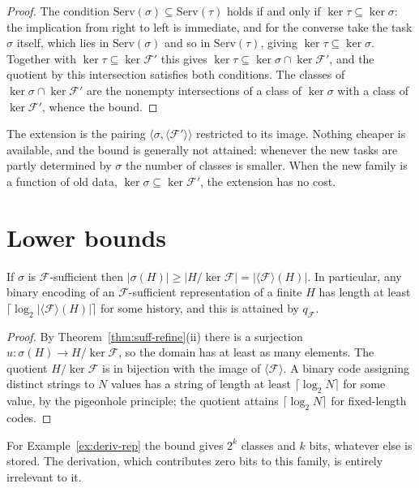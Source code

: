 \begin{proof}
The condition $\mathrm{Serv}(\sigma)\subseteq\mathrm{Serv}(\tau)$ holds if and only if $\ker\tau\subseteq\ker\sigma$: the implication from right to left is immediate, and for the converse take the task $\sigma$ itself, which lies in $\mathrm{Serv}(\sigma)$ and so in $\mathrm{Serv}(\tau)$, giving $\ker\tau\subseteq\ker\sigma$. Together with $\ker\tau\subseteq\ker\mathcal F'$ this gives $\ker\tau\subseteq\ker\sigma\cap\ker\mathcal F'$, and the quotient by this intersection satisfies both conditions. The classes of $\ker\sigma\cap\ker\mathcal F'$ are the nonempty intersections of a class of $\ker\sigma$ with a class of $\ker\mathcal F'$, whence the bound.
\end{proof}

The extension is the pairing $\langle\sigma,\langle\mathcal F'\rangle\rangle$ restricted to its image. Nothing cheaper is available, and the bound is generally not attained: whenever the new tasks are partly determined by $\sigma$ the number of classes is smaller. When the new family is a function of old data, $\ker\sigma\subseteq\ker\mathcal F'$, the extension has no cost.

\section{Lower bounds}

\begin{theorem}
\label{thm:lower}
If $\sigma$ is $\mathcal F$-sufficient then $|\sigma(H)|\ge|H/\ker\mathcal F|=|\langle\mathcal F\rangle(H)|$. In particular, any binary encoding of an $\mathcal F$-sufficient representation of a finite $H$ has length at least $\lceil\log_2|\langle\mathcal F\rangle(H)|\rceil$ for some history, and this is attained by $q_{\mathcal F}$.
\end{theorem}

\begin{proof}
By Theorem~\ref{thm:suff-refine}(ii) there is a surjection $u:\sigma(H)\to H/\ker\mathcal F$, so the domain has at least as many elements. The quotient $H/\ker\mathcal F$ is in bijection with the image of $\langle\mathcal F\rangle$. A binary code assigning distinct strings to $N$ values has a string of length at least $\lceil\log_2 N\rceil$ for some value, by the pigeonhole principle; the quotient attains $\lceil\log_2 N\rceil$ for fixed-length codes.
\end{proof}

For Example~\ref{ex:deriv-rep} the bound gives $2^k$ classes and $k$ bits, whatever else is stored. The derivation, which contributes zero bits to this family, is entirely irrelevant to it.

